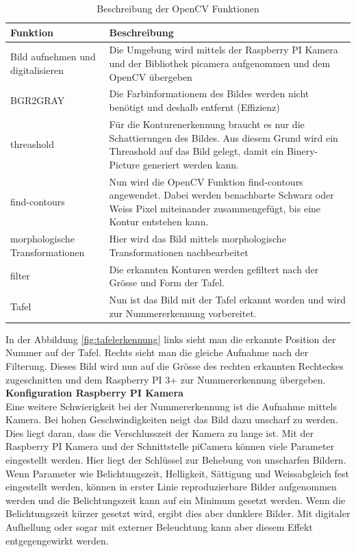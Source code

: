 \documentclass[../../main.tex]{subfiles}
\begin{document}
    \begin{table}[H]
        \begin{flushleft}
            \begin{tabular}{ | p{3cm} | p{10.5cm} |}
                \hline
                \textbf{Funktion}  & \textbf{Beschreibung} \\\hline
                Bild aufnehmen und digitalisieren & Die Umgebung wird mittels der Raspberry PI Kamera und der Bibliothek picamera aufgenommen und dem OpenCV übergeben \\\hline
                BGR2GRAY & Die Farbinformationem des Bildes werden nicht benötigt und deshalb entfernt (Effizienz) \\ \hline
                threashold & Für die Konturenerkennung braucht es nur die Schattierungen des Bildes. Aus diesem Grund wird ein Threashold auf das Bild gelegt, damit ein Binery-Picture generiert werden kann. \\ \hline
                find-contours & Nun wird die OpenCV Funktion find-contours angewendet. Dabei werden benachbarte Schwarz oder Weiss Pixel miteinander zusammengefügt, bis eine Kontur entstehen kann. \\ \hline
                morphologische Transformationen & Hier wird das Bild mittels morphologische Transformationen nachbearbeitet \\ \hline
                filter & Die erkannten Konturen werden gefiltert nach der Grösse und Form der Tafel. \\ \hline
                Tafel & Nun ist das Bild mit der Tafel erkannt worden und wird zur Nummererkennung vorbereitet. \\ \hline
            \end{tabular}
        \end{flushleft}
        \caption{Beschreibung der OpenCV Funktionen}
        \label{tab:OpenCV_Funktionen_Tafelerkennung}
     \end{table}

     In der Abbildung \ref{fig:tafelerkennung} links sieht man die erkannte Position der Nummer auf der Tafel. Rechts sieht man die gleiche Aufnahme nach der Filterung. Dieses Bild wird nun auf die Grösse des rechten erkannten Rechteckes zugeschnitten und dem Raspberry PI 3+ zur Nummererkennung übergeben.\\

     \textbf{Konfiguration Raspberry PI Kamera}\\
     Eine weitere Schwierigkeit bei der Nummererkennung ist die Aufnahme mittels Kamera. Bei hohen Geschwindigkeiten neigt das Bild dazu unscharf zu werden. Dies liegt daran, dass die Verschlusszeit der Kamera zu lange ist. Mit der Raspberry PI Kamera und der Schnittstelle piCamera können viele Parameter eingestellt werden. Hier liegt der Schlüssel zur Behebung von unscharfen Bildern. Wenn Parameter wie Belichtungszeit, Helligkeit, Sättigung und Weissabgleich fest eingestellt werden, können in erster Linie reproduzierbare Bilder aufgenommen werden und die Belichtungszeit kann auf ein Minimum gesetzt werden. Wenn die Belichtungszeit kürzer gesetzt wird, ergibt dies aber dunklere Bilder. Mit digitaler Aufhellung oder sogar mit externer Beleuchtung kann aber diesem Effekt entgegengewirkt werden.
\end{document}
